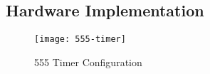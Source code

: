 \subsection{Hardware Implementation}
\begin{figure}
	\caption{555 Timer Configuration \cite{slide:interface}}
	\centering
	\texttt{[image: 555-timer]}
	\label{fig:555}
\end{figure}
